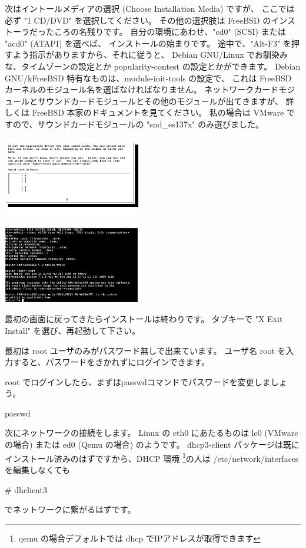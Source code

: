 \documentclass[mingoth,a4paper]{jsarticle}
\begin{document}
次はイントールメディアの選択 (Choose Installation Media) ですが、
ここでは必ず "1 CD/DVD" を選択してください。
その他の選択肢は FreeBSD のインストーラだったころの名残りです。
自分の環境にあわせ、"cd0" (SCSI) または "acd0" (ATAPI) を選べば、
インストールの始まりです。
途中で、"Alt-F3" を押すよう指示がありますから、それに従うと、
Debian GNU/Linux でお馴染みな、タイムゾーンの設定とか popularity-contest 
の設定とかができます。
Debian GNU/kFreeBSD 特有なものは、module-init-tools の設定で、
これは FreeBSD カーネルのモジュール名を選ばなければなりません。
ネットワークカードモジュールとサウンドカードモジュールとその他のモジュールが出てきますが、
詳しくは FreeBSD 本家のドキュメントを見てください。
私の場合は VMware ですので、サウンドカードモジュールの "snd\_es137x" のみ選びました。
\\
\begin{minipage}{0.4\hsize}
\includegraphics[width=6cm]{image200906/kfreebsd12_mono.png}
\end{minipage}
\begin{minipage}{0.4\hsize}
\includegraphics[width=6cm]{image200906/kfreebsdlogin_mono.png}
\end{minipage}

最初の画面に戻ってきたらインストールは終わりです。
タブキーで "X Exit Install" を選び、再起動して下さい。

最初は root ユーザのみがパスワード無しで出来ています。
ユーザ名 root を入力すると、パスワードをきかれずにログインできます。


root でログインしたら、まずはpasswdコマンドでパスワードを変更しましょう。
\begin{commandline}
passwd
\end{commandline}

次にネットワークの接続をします。
Linux の eth0 にあたるものは le0 (VMware の場合) または ed0 (Qemu の場合) 
のようです。
dhcp3-client パッケージは既にインストール済みのはずですから、DHCP 環境
\footnote{qemu の場合デフォルトでは dhcp でIPアドレスが取得できます}の人は /etc/network/interfaces を編集しなくても
\begin{commandline}
# dhclient3
\end{commandline}
でネットワークに繋がるはずです。
\end{document}
